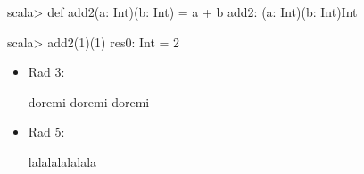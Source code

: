 \TaskSolved \what

\SubtaskSolved
\begin{REPL}
scala> def add2(a: Int)(b: Int) = a + b
add2: (a: Int)(b: Int)Int

scala> add2(1)(1)
res0: Int = 2
\end{REPL}

\SubtaskSolved
\begin{itemize}

\item Rad 3:
\begin{REPLnonum}
doremi doremi doremi
\end{REPLnonum}

\item Rad 5:
\begin{REPLnonum}
lalalalalalala
\end{REPLnonum}

\end{itemize}


\QUESTEND
